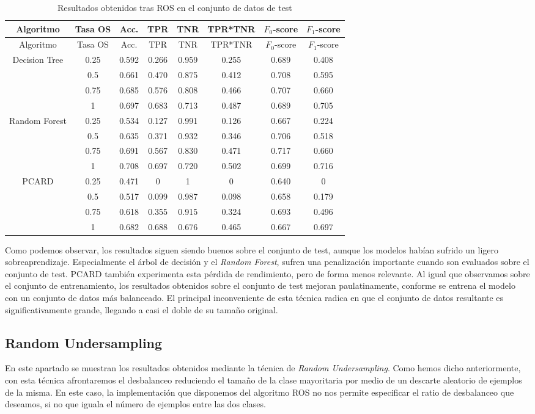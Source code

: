 \documentclass[
  a4paper,
,tablecaptionabove
]{scrartcl}
\begin{document}
\begin{longtable}[]{@{}cccccccc@{}}
\caption{Resultados obtenidos tras ROS en el conjunto de datos de
test}\tabularnewline
\toprule
Algoritmo & Tasa OS & Acc. & TPR & TNR & TPR*TNR & \(F_0\)-score &
\(F_1\)-score\tabularnewline
\midrule
\endfirsthead
\toprule
Algoritmo & Tasa OS & Acc. & TPR & TNR & TPR*TNR & \(F_0\)-score &
\(F_1\)-score\tabularnewline
\midrule
\endhead
Decision Tree & 0.25 & 0.592 & 0.266 & 0.959 & 0.255 & 0.689 &
0.408\tabularnewline
& 0.5 & 0.661 & 0.470 & 0.875 & 0.412 & 0.708 & 0.595\tabularnewline
& 0.75 & 0.685 & 0.576 & 0.808 & 0.466 & 0.707 & 0.660\tabularnewline
& 1 & 0.697 & 0.683 & 0.713 & 0.487 & 0.689 & 0.705\tabularnewline
\midrule
Random Forest & 0.25 & 0.534 & 0.127 & 0.991 & 0.126 & 0.667 &
0.224\tabularnewline
& 0.5 & 0.635 & 0.371 & 0.932 & 0.346 & 0.706 & 0.518\tabularnewline
& 0.75 & 0.691 & 0.567 & 0.830 & 0.471 & 0.717 & 0.660\tabularnewline
& 1 & 0.708 & 0.697 & 0.720 & 0.502 & 0.699 & 0.716\tabularnewline
\midrule
PCARD & 0.25 & 0.471 & 0 & 1 & 0 & 0.640 & 0\tabularnewline
& 0.5 & 0.517 & 0.099 & 0.987 & 0.098 & 0.658 & 0.179\tabularnewline
& 0.75 & 0.618 & 0.355 & 0.915 & 0.324 & 0.693 & 0.496\tabularnewline
& 1 & 0.682 & 0.688 & 0.676 & 0.465 & 0.667 & 0.697\tabularnewline
\bottomrule
\end{longtable}

Como podemos observar, los resultados siguen siendo buenos sobre el
conjunto de test, aunque los modelos habían sufrido un ligero
sobreaprendizaje. Especialmente el árbol de decisión y el \emph{Random
Forest}, sufren una penalización importante cuando son evaluados sobre
el conjunto de test. PCARD también experimenta esta pérdida de
rendimiento, pero de forma menos relevante. Al igual que observamos
sobre el conjunto de entrenamiento, los resultados obtenidos sobre el
conjunto de test mejoran paulatinamente, conforme se entrena el modelo
con un conjunto de datos más balanceado. El principal inconveniente de
esta técnica radica en que el conjunto de datos resultante es
significativamente grande, llegando a casi el doble de su tamaño
original.

\hypertarget{random-undersampling}{%
\subsection{Random Undersampling}\label{random-undersampling}}

En este apartado se muestran los resultados obtenidos mediante la
técnica de \emph{Random Undersampling}. Como hemos dicho anteriormente,
con esta técnica afrontaremos el desbalanceo reduciendo el tamaño de la
clase mayoritaria por medio de un descarte aleatorio de ejemplos de la
misma. En este caso, la implementación que disponemos del algoritmo ROS
no nos permite especificar el ratio de desbalanceo que deseamos, si no
que iguala el número de ejemplos entre las dos clases.
\end{document}

